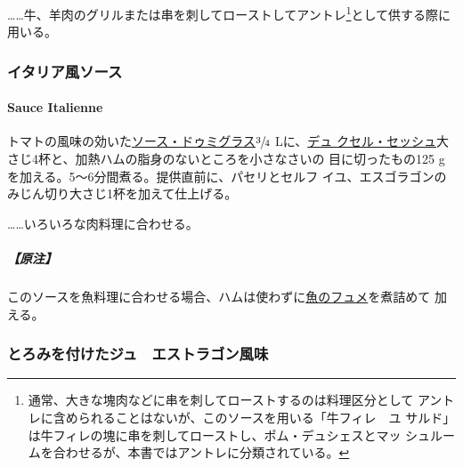 \ldots{}\ldots{}牛、羊肉のグリルまたは串を刺してローストしてアントレ\footnote{通常、大きな塊肉などに串を刺してローストするのは料理区分として
  アントレに含められることはないが、このソースを用いる「牛フィレ　ユ
  サルド」は牛フィレの塊に串を刺してローストし、ポム・デュシェスとマッ
  シュルームを合わせるが、本書ではアントレに分類されている。}として供する際に用いる。

\maeaki

\hypertarget{ux30a4ux30bfux30eaux30a2ux98a8ux30bdux30fcux30b9}{%
\subsubsection{イタリア風ソース}\label{ux30a4ux30bfux30eaux30a2ux98a8ux30bdux30fcux30b9}}

\hypertarget{sauce-italienne}{%
\paragraph{Sauce Italienne}\label{sauce-italienne}}


トマトの風味の効いた\protect\hyperlink{sauce-demi-glace}{ソース・ドゥミグラス}\(\sfrac{3}{4}\)
Lに、\href{}{デュ
クセル・セッシュ}大さじ4杯と、加熱ハムの脂身のないところを小さなさいの
目に切ったもの125 gを加える。5〜6分間煮る。提供直前に、パセリとセルフ
イユ、エスゴラゴンのみじん切り大さじ1杯を加えて仕上げる。

\ldots{}\ldots{}いろいろな肉料理に合わせる。

\hypertarget{ux539fux6ce8-4}{%
\subparagraph{【原注】}\label{ux539fux6ce8-4}}

このソースを魚料理に合わせる場合、ハムは使わずに\protect\hyperlink{fumet-de-poisson}{魚のフュメ}を煮詰めて
加える。

\maeaki

\hypertarget{ux3068ux308dux307fux3092ux4ed8ux3051ux305fux30b8ux30e5ux30a8ux30b9ux30c8ux30e9ux30b4ux30f3ux98a8ux5473}{%
\subsubsection{とろみを付けたジュ　エストラゴン風味}\label{ux3068ux308dux307fux3092ux4ed8ux3051ux305fux30b8ux30e5ux30a8ux30b9ux30c8ux30e9ux30b4ux30f3ux98a8ux5473}}


